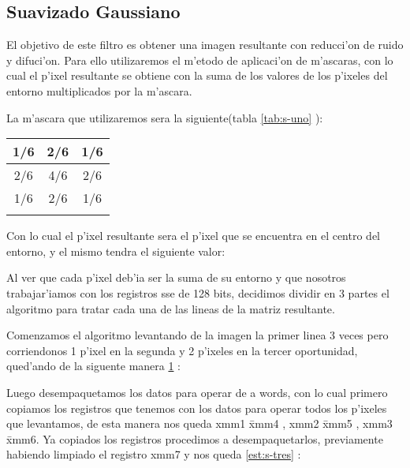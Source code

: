 \subsection{Suavizado Gaussiano}
El objetivo de este filtro es obtener una imagen resultante con reducci'on de ruido y difuci'on. 
Para ello utilizaremos el m'etodo de aplicaci'on de m'ascaras, con lo cual el p'ixel resultante se obtiene con la suma
de los valores de los p'ixeles del entorno multiplicados por la m'ascara.

La m'ascara que utilizaremos sera la siguiente(tabla \ref{tab:s-uno} ):

\begin{tabular}{| c | c | c |}
1/6 & 2/6 & 1/6 \\ \hline
2/6 & 4/6 & 2/6 \\ \hline
1/6 & 2/6 & 1/6 \\ \hline
\label{tab:s-uno}
\end{tabular}

Con lo cual el p'ixel resultante sera el p'ixel que se encuentra en el centro del entorno, y el mismo tendra el siguiente valor:

Al ver que cada p'ixel deb'ia ser la suma de su entorno y que nosotros trabajar'iamos con los registros sse de 128 bits, decidimos 
dividir en 3 partes el algoritmo para tratar cada una de las lineas de la matriz resultante.

Comenzamos el algoritmo levantando de la imagen la primer linea 3 veces pero corriendonos 1 p'ixel en la segunda y 2 p'ixeles en la 
tercer oportunidad, qued'ando de la siguente manera \ref{est:s-dos} :

\begin{figure}[ht]
\label{est:s-dos}
\end{figure}

Luego desempaquetamos los datos para operar de a words, con lo cual primero copiamos los registros que tenemos con los datos para operar todos los p'ixeles que levantamos, de esta manera nos queda xmm1 \= xmm4 , xmm2 \= xmm5 , xmm3 \= xmm6.
Ya copiados los registros procedimos a desempaquetarlos, previamente habiendo limpiado el registro xmm7 y nos queda \ref{est:s-tres} :

